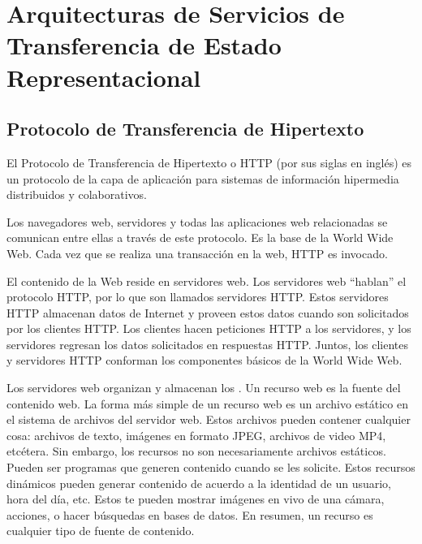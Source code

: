 
\section{Arquitecturas de Servicios de Transferencia de Estado Representacional}
\label{\detokenize{chapter_one/rest:arquitecturas-de-servicios-de-transferencia-de-estado-representacional}}\label{\detokenize{chapter_one/rest::doc}}

\subsection{Protocolo de Transferencia de Hipertexto}
\label{\detokenize{chapter_one/rest:protocolo-de-transferencia-de-hipertexto}}
\begin{remark}
El Protocolo de Transferencia de Hipertexto o HTTP (por sus siglas en inglés)
es un protocolo de la capa de aplicación para sistemas de información
hipermedia distribuidos y colaborativos.

\end{remark}

Los navegadores web, servidores y todas las aplicaciones web
relacionadas se comunican entre ellas a través de este protocolo. Es la
base de la World Wide Web. Cada vez que se realiza una transacción en la
web, HTTP es invocado.

El contenido de la Web reside en servidores web. Los servidores web
“hablan” el protocolo HTTP, por lo que son llamados servidores HTTP.
Estos servidores HTTP almacenan datos de Internet y proveen estos datos
cuando son solicitados por los clientes HTTP. Los clientes hacen
peticiones HTTP a los servidores, y los servidores regresan los datos
solicitados en respuestas HTTP. Juntos, los clientes y servidores HTTP
conforman los componentes básicos de la World Wide Web.

Los servidores web organizan y almacenan los . Un recurso
web es la fuente del contenido web. La forma más simple de un recurso
web es un archivo estático en el sistema de archivos del servidor web.
Estos archivos pueden contener cualquier cosa: archivos de texto,
imágenes en formato JPEG, archivos de video MP4, etcétera. Sin embargo,
los recursos no son necesariamente archivos estáticos. Pueden ser
programas que generen contenido cuando se les solicite. Estos recursos
dinámicos pueden generar contenido de acuerdo a la identidad de un
usuario, hora del día, etc. Estos te pueden mostrar imágenes en vivo de
una cámara, acciones, o hacer búsquedas en bases de datos.
En resumen, un recurso es cualquier tipo de fuente de contenido.

